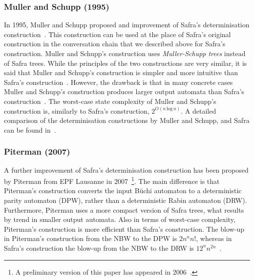 \subsubsection{Muller and Schupp (1995)}
\label{2_ms95}
In 1995, Muller and Schupp proposed and improvement of Safra's determinisation construction~\cite{Muller199569}. This construction can be used at the place of Safra's original construction in the conversation chain that we described above for Safra's construction. Muller and Schupp's construction uses \textit{Muller-Schupp trees} instead of Safra trees. While the principles of the two constructions are very similar, it is said that Muller and Schupp's construction is simpler and more intuitive than Safra's construction~\cite{2002_roggenbach}. However, the drawback is that in many concrete cases Muller and Schupp's construction produces larger output automata than Safra's construction~\cite{2006_althoff}. The worst-case state complexity of Muller and Schupp's construction is, similarly to Safra's construction, $2^{O\left(n\, \text{log}\, n\right)}$.  A detailed comparison of the determinisation constructions by Muller and Schupp, and Safra can be found in~\cite{2006_althoff}.


\subsubsection{Piterman (2007)}
\label{2_pit07}
A further improvement of Safra's determinisation construction has been proposed by Piterman from EPF Lausanne in 2007~\cite{2007_piterman}\footnote{A preliminary version of this paper has appeared in 2006~\cite{2006_piterman}.}. The main difference is that Piterman's construction converts the input Büchi automaton to a deterministic parity automaton (DPW), rather than a deterministic Rabin automaton (DRW). Furthermore, Piterman uses a more compact version of Safra trees, what results by trend in smaller output automata. Also in terms of worst-case complexity, Piterman's construction is more efficient than Safra's construction. The blow-up in Piterman's construction from the NBW to the DPW is $2n^nn!$, whereas in Safra's construction the blow-up from the NBW to the DRW is $12^nn^{2n}$~\cite{2006_piterman,2007_piterman}.

